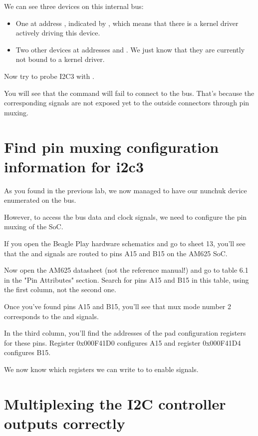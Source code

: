 We can see three devices on this internal bus:
\begin{itemize}
\item One at address , indicated by ,
      which means that there is a kernel driver actively
      driving this device.
\item Two other devices at addresses  and .
      We just know that they are currently not bound to a kernel driver.
\end{itemize}

Now try to probe I2C3 with .

You will see that the command will fail to connect to
the bus. That's because the corresponding signals are
not exposed yet to the outside connectors through pin muxing.

\section{Find pin muxing configuration information for i2c3}

As you found in the previous lab, we now managed to have our nunchuk
device enumerated on the  bus.

However, to access the bus data and clock signals, we need to configure
the pin muxing of the SoC.

If you open the Beagle Play hardware schematics and go to sheet 13,
you'll see that the  and  signals are routed to pins
A15 and B15 on the AM625 SoC.

Now open the AM625 datasheet (not the reference manual!) and go to
table 6.1 in the "Pin Attributes" section. Search for pins A15 and
B15 in this table, using the first column, not the second one.

Once you've found pins A15 and B15, you'll see that mux mode number 2
corresponds to the  and  signals.

In the third column, you'll find the addresses of the pad configuration
registers for these pins. Register 0x000F41D0 configures A15 and register
0x000F41D4 configures B15.


We now know which registers we can write to to enable 
signals.

\section{Multiplexing the I2C controller outputs correctly}

